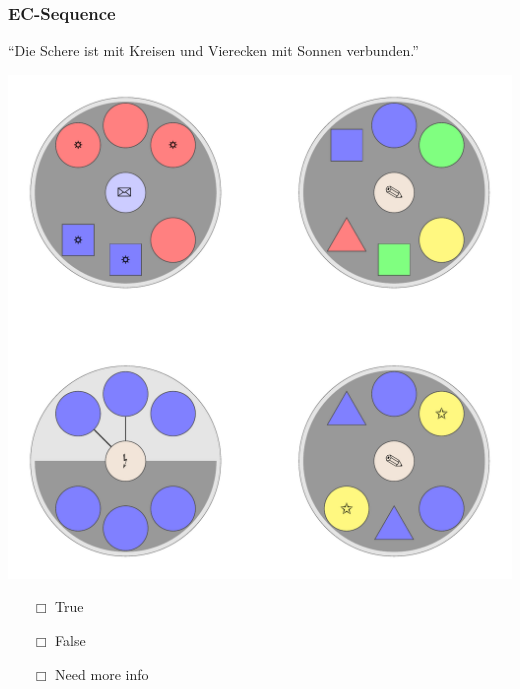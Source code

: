 \documentclass[fleqn,10pt,serif,xcolor=dvipsnames]{beamer}
\newcommand{\EC}{EC\xspace}
\newcommand{\mymark}[1]{{\color{blue}{#1}}}
\begin{document}
\begin{frame}
  \frametitle{\EC-Sequence}
  \begin{center}
    ``Die Schere ist mit Kreisen und Vierecken mit Sonnen verbunden.''

    \vspace{0.1cm}

    \includegraphics[width=0.5 \textwidth]{../../pictures/ec_01_2.pdf}

    \vspace{0.1cm}

    \begin{multicols}{3}
      \begin{itemize} 
      \item[$\Box$] True\\
        \onslide<2>{$\leadsto$  \mymark{false}}
      \item[$\Box$] False\\
        \onslide<2>{$\leadsto$ \mymark{false}}
      \item[$\Box$] Need more info 
      \end{itemize}
    \end{multicols}

  \end{center}
\end{frame}
\end{document}
